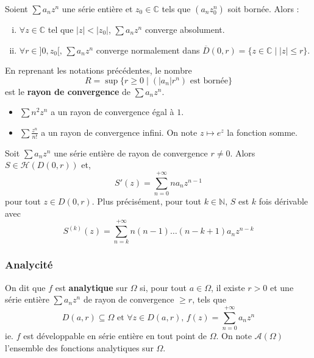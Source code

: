 	\begin{lemma}[Abel]
		Soient $\sum a_n z^n$ une série entière et $z_0 \in \mathbb{C}$ tels que $(a_n z_0^n)$ soit bornée. Alors :
		\begin{enumerate}[(i)]
			\item $\forall z \in \mathbb{C}$ tel que $|z| < |z_0|$, $\sum a_n z^n$ converge absolument.
			\item $\forall r \in ]0,z_0[, \, \sum a_n z^n$ converge normalement dans $\overline{D}(0, r) = \{ z \in \mathbb{C} \mid |z| \leq r \}$.
		\end{enumerate}
	\end{lemma}

	\begin{definition}
		En reprenant les notations précédentes, le nombre
		\[ R = \sup \{ r \geq 0 \mid (|a_n|r^n) \text{ est bornée} \} \]
		est le \textbf{rayon de convergence} de $\sum a_n z^n$.
	\end{definition}


	\begin{example}
		\begin{itemize}
			\item $\sum n^2 z^n$ a un rayon de convergence égal à $1$.
			\item $\sum \frac{z^n}{n!}$ a un rayon de convergence infini. On note $z \mapsto e^z$ la fonction somme.
		\end{itemize}
	\end{example}


	\begin{proposition}
		Soit $\sum a_n z^n$ une série entière de rayon de convergence $r \neq 0$. Alors $S \in \mathcal{H}(D(0, r))$ et,
		\[ S'(z) = \sum_{n=0}^{+\infty} n a_n z^{n-1} \]
		pour tout $z \in D(0, r)$.
		\newpar
		Plus précisément, pour tout $k \in \mathbb{N}$, $S$ est $k$ fois dérivable avec
		\[ S^{(k)}(z) = \sum_{n=k}^{+\infty} n (n-1) \dots (n-k+1) a_n z^{n-k} \]
	\end{proposition}

	\newpage
	\subsubsection{Analycité}


	\begin{definition}
		On dit que $f$ est \textbf{analytique} sur $\Omega$ si, pour tout $a \in \Omega$, il existe $r > 0$ et une série entière $\sum a_n z^n$ de rayon de convergence $\geq r$, tels que
		\[ D(a, r) \subseteq \Omega \text{ et } \forall z \in D(a, r), \, f(z) = \sum_{n=0}^{+\infty} a_n z^n \]
		ie. $f$ est développable en série entière en tout point de $\Omega$. On note $\mathcal{A}(\Omega)$ l'ensemble des fonctions analytiques sur $\Omega$.
	\end{definition}

